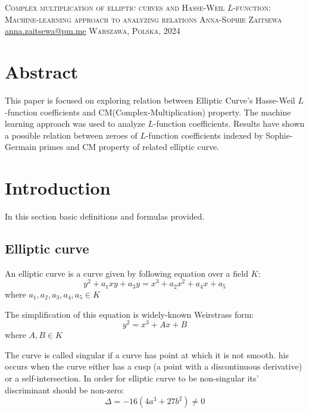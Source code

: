 \documentclass[11pt]{article}
\begin{document}
    \begin{titlepage}
        \hspace{3cm}
        \center\large\textsc{
            Complex multiplication of elliptic curves and Hasse-Weil $L$-function:
            Machine-learning approach to analyzing relations}
        \vspace{1cm}
        \center\textsc{Anna-Sophie Zaitsewa}
        \center\small
        \href{mailto:anna.zaitsewa@pm.me}{anna.zaitsewa@pm.me}
        \center\textsc{Warszawa, Polska, 2024}
        \author{Anna-Sophie Zaitsewa}
    \end{titlepage}
    \newpage
    \tableofcontents
    \newpage
    \section{Abstract}\label{sec:abstract}
    This paper is focused on exploring relation between Elliptic Curve's Hasse-Weil $L$-function
    coefficients and CM(Complex-Multiplication) property.
    The machine learning approach was used to analyze $L$-function coefficients.
    Results have shown a possible relation between zeroes of $L$-function coefficients indexed by Sophie-Germain primes
    and CM property of related elliptic curve.

    \section{Introduction}\label{sec:introduction}
    In this section basic definitions and formulas provided.
    \subsection{Elliptic curve}\label{subsec:ellpiticcurve}
    An elliptic curve is a curve given by following equation over a field $K$:
    \[
     y^2 + a_1xy+a_3y=x^3 + a_2x^2 + a_4x + a_5
    \]
    where $a_1, a_2, a_3, a_4, a_5 \in K$

    The simplification of this equation is widely-known Weirstrass form:
    \[
        y^2 = x^3 + Ax + B
    \]
    where $A,B\in K$

    The curve is called singular if a curve has point at which it is not smooth.
    his occurs when the curve either has a cusp (a point with a discontinuous derivative) or a self-intersection.
    In order for elliptic curve to be non-singular its' discriminant should be non-zero:
    \[
        \Delta = -16(4a^3+27b^2) \ne 0
    \]
    
\end{document}
